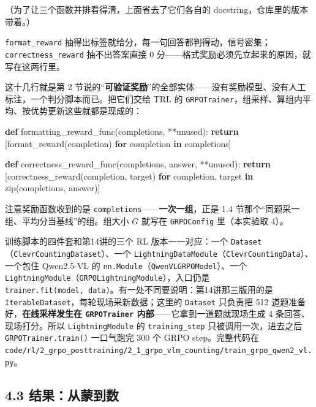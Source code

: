 \documentclass[
  chinese,
]{ctexart}
\newenvironment{Shaded}{\begin{snugshade}}{\end{snugshade}}
\newcommand{\BuiltInTok}[1]{\textcolor[rgb]{0.00,0.23,0.31}{#1}}
\newcommand{\ControlFlowTok}[1]{\textcolor[rgb]{0.00,0.23,0.31}{\textbf{#1}}}
\newcommand{\KeywordTok}[1]{\textcolor[rgb]{0.00,0.23,0.31}{\textbf{#1}}}
\newcommand{\NormalTok}[1]{\textcolor[rgb]{0.00,0.23,0.31}{#1}}
\newcommand{\OperatorTok}[1]{\textcolor[rgb]{0.37,0.37,0.37}{#1}}
\begin{document}
（为了让三个函数并排看得清，上面省去了它们各自的
docstring，仓库里的版本带着。）

\texttt{format\_reward}
抽得出标签就给分，每一句回答都判得动，信号密集；\texttt{correctness\_reward}
抽不出答案直接 0 分------格式奖励必须先立起来的原因，就写在这两行里。

这十几行就是第 2
节说的``\textbf{可验证奖励}''的全部实体------没有奖励模型、没有人工标注，一个判分脚本而已。把它们交给
TRL 的
\texttt{GRPOTrainer}，组采样、算组内平均、按优势更新这些就都是现成的：

\begin{Shaded}
\begin{Highlighting}[]
        \KeywordTok{def}\NormalTok{ formatting\_reward\_func(completions, }\OperatorTok{**}\NormalTok{unused):}
            \ControlFlowTok{return}\NormalTok{ [format\_reward(completion) }\ControlFlowTok{for}\NormalTok{ completion }\KeywordTok{in}\NormalTok{ completions]}

        \KeywordTok{def}\NormalTok{ correctness\_reward\_func(completions, answer, }\OperatorTok{**}\NormalTok{unused):}
            \ControlFlowTok{return}\NormalTok{ [correctness\_reward(completion, target)}
                    \ControlFlowTok{for}\NormalTok{ completion, target }\KeywordTok{in} \BuiltInTok{zip}\NormalTok{(completions, answer)]}
\end{Highlighting}
\end{Shaded}

注意奖励函数收到的是 \texttt{completions}------\textbf{一次一组}，正是
1.4 节那个``同题采一组、平均分当基线''的组。组大小 \(G\) 就写在
\texttt{GRPOConfig} 里（本实验取 4）。

训练脚本的四件套和第14讲的三个 RL 版本一一对应：一个
\texttt{Dataset}（\texttt{ClevrCountingDataset}）、一个
\texttt{LightningDataModule}（\texttt{ClevrCountingData}）、一个包住
Qwen2.5-VL 的 \texttt{nn.Module}（\texttt{QwenVLGRPOModel}）、一个
\texttt{LightningModule}（\texttt{GRPOLightningModule}），入口仍是
\texttt{trainer.fit(model,\ data)}。有一处不同要说明：第14讲那三版用的是
\texttt{IterableDataset}，每轮现场采新数据；这里的 \texttt{Dataset}
只负责把 512 道题准备好，\textbf{在线采样发生在 \texttt{GRPOTrainer}
内部}------它拿到一道题就现场生成 4 条回答、现场打分。所以
\texttt{LightningModule} 的 \texttt{training\_step}
只被调用一次，进去之后 \texttt{GRPOTrainer.train()} 一口气跑完 300 个
GRPO step。完整代码在
\texttt{code/rl/2\_grpo\_posttraining/2\_1\_grpo\_vlm\_counting/train\_grpo\_qwen2\_vl.py}。

\subsection{4.3
结果：从蒙到数}\label{ux7ed3ux679cux4eceux8499ux5230ux6570}
\end{document}

